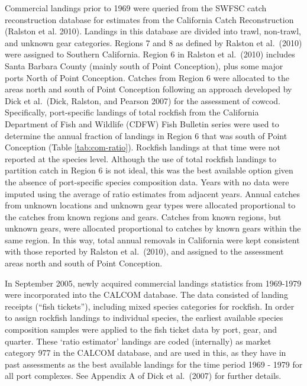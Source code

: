 \documentclass[11pt,
  english,
  a4paper,
]{article}
\begin{document}
Commercial landings prior to 1969 were queried from the SWFSC catch reconstruction database for estimates from the California Catch Reconstruction {(Ralston et al. 2010)\leavevmode\tagmcend\tagstructend}. Landings in this database are divided into trawl, non-trawl, and unknown gear categories. Regions 7 and 8 as defined by Ralston et al.~{(2010)\leavevmode\tagmcend\tagstructend} were assigned to Southern California. Region 6 in Ralston et al.~{(2010)\leavevmode\tagmcend\tagstructend} includes Santa Barbara County (mainly south of Point Conception), plus some major ports North of Point Conception. Catches from Region 6 were allocated to the areas north and south of Point Conception following an approach developed by Dick et al.~{(Dick, Ralston, and Pearson 2007)\leavevmode\tagmcend\tagstructend} for the assessment of cowcod. Specifically, port-specific landings of total rockfish from the California Department of Fish and Wildlife (CDFW) Fish Bulletin series were used to determine the annual fraction of landings in Region 6 that was south of Point Conception (Table \ref{tab:com-ratio}). Rockfish landings at that time were not reported at the species level. Although the use of total rockfish landings to partition catch in Region 6 is not ideal, this was the best available option given the absence of port-specific species composition data. Years with no data were imputed using the average of ratio estimates from adjacent years. Annual catches from unknown locations and unknown gear types were allocated proportional to the catches from known regions and gears. Catches from known regions, but unknown gears, were allocated proportional to catches by known gears within the same region. In this way, total annual removals in California were kept consistent with those reported by Ralston et al.~{(2010)\leavevmode\tagmcend\tagstructend}, and assigned to the assessment areas north and south of Point Conception.

\leavevmode\tagmcend\tagstructend\par


In September 2005, newly acquired commercial landings statistics from 1969-1979 were incorporated into the CALCOM database. The data consisted of landing receipts (``fish tickets''), including mixed species categories for rockfish. In order to assign rockfish landings to individual species, the earliest available species composition samples were applied to the fish ticket data by port, gear, and quarter. These `ratio estimator' landings are coded (internally) as market category 977 in the CALCOM database, and are used in this, as they have in past assessments as the best available landings for the time period 1969 - 1979 for all port complexes. See Appendix A of Dick et al.~{(2007)\leavevmode\tagmcend\tagstructend} for further details.
\end{document}
